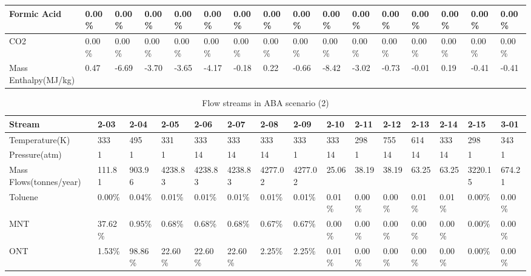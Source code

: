 \begin{landscape}
\begin{table}[H]
\begin{tabular}{|l|l|l|l|l|l|l|l|l|l|l|l|l|l|l|l|}
Formic Acid             & 0.00\%  & 0.00\%  & 0.00\%  & 0.00\%  & 0.00\%  & 0.00\%  & 0.00\%  & 0.00\%  & 0.00\%  & 0.00\%  & 0.00\%  & 0.00\%  & 0.00\%  & 0.00\%   & 0.00\%  \\ \hline
CO2                     & 0.00\%  & 0.00\%  & 0.00\%  & 0.00\%  & 0.00\%  & 0.00\%  & 0.00\%  & 0.00\%  & 0.00\%  & 0.00\%  & 0.00\%  & 0.00\%  & 0.00\%  & 0.00\%   & 0.00\%  \\ \hline
Mass Enthalpy(MJ/kg)    & 0.47    & -6.69   & -3.70   & -3.65   & -4.17   & -0.18   & 0.22    & -0.66   & -8.42   & -3.02   & -0.73   & -0.01   & 0.19    & -0.41    & -0.41   \\ \hline
\end{tabular}
\end{table}




\begin{table}[H]
\centering
\caption{Flow streams in ABA scenario (2)}
\label{ABAFST2}
\begin{tabular}{|l|l|l|l|l|l|l|l|l|l|l|l|l|l|l|}
\hline
\textbf{Stream}         & 2-03    & 2-04    & 2-05    & 2-06    & 2-07    & 2-08    & 2-09    & 2-10    & 2-11     & 2-12     & 2-13    & 2-14    & 2-15    & 3-01     \\ \hline
Temperature(K)          & 333     & 495     & 331     & 333     & 333     & 333     & 333     & 333     & 298      & 755      & 614     & 333     & 298     & 343      \\ \hline
Pressure(atm)           & 1       & 1       & 1       & 14      & 14      & 14      & 1       & 14      & 1        & 14       & 14      & 14      & 1       & 1        \\ \hline
Mass Flows(tonnes/year) & 111.81  & 903.96  & 4238.83 & 4238.83 & 4238.83 & 4277.02 & 4277.02 & 25.06   & 38.19    & 38.19    & 63.25   & 63.25   & 3220.15 & 674.21   \\ \hline
Toluene                 & 0.00\%  & 0.04\%  & 0.01\%  & 0.01\%  & 0.01\%  & 0.01\%  & 0.01\%  & 0.01\%  & 0.00\%   & 0.00\%   & 0.01\%  & 0.01\%  & 0.00\%  & 0.00\%   \\ \hline
MNT                     & 37.62\% & 0.95\%  & 0.68\%  & 0.68\%  & 0.68\%  & 0.67\%  & 0.67\%  & 0.00\%  & 0.00\%   & 0.00\%   & 0.00\%  & 0.00\%  & 0.00\%  & 0.00\%   \\ \hline
ONT                     & 1.53\%  & 98.86\% & 22.60\% & 22.60\% & 22.60\% & 2.25\%  & 2.25\%  & 0.01\%  & 0.00\%   & 0.00\%   & 0.00\%  & 0.00\%  & 0.00\%  & 0.00\%   \\ \hline

\end{tabular}
\end{table}
\end{landscape}
